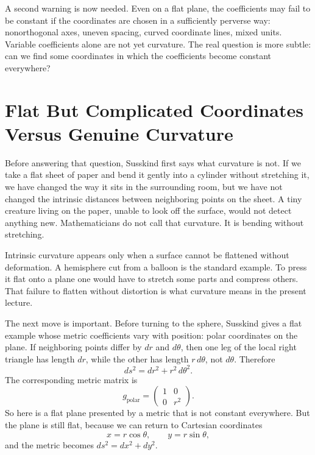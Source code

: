 A second warning is now needed. Even on a flat plane, the coefficients may fail to be constant if the coordinates are chosen in a sufficiently perverse way: nonorthogonal axes, uneven spacing, curved coordinate lines, mixed units. Variable coefficients alone are not yet curvature. The real question is more subtle: can we find some coordinates in which the coefficients become constant everywhere?

\section{Flat But Complicated Coordinates Versus Genuine Curvature}

Before answering that question, Susskind first says what curvature is not. If we take a flat sheet of paper and bend it gently into a cylinder without stretching it, we have changed the way it sits in the surrounding room, but we have not changed the intrinsic distances between neighboring points on the sheet. A tiny creature living on the paper, unable to look off the surface, would not detect anything new. Mathematicians do not call that curvature. It is bending without stretching.

Intrinsic curvature appears only when a surface cannot be flattened without deformation. A hemisphere cut from a balloon is the standard example. To press it flat onto a plane one would have to stretch some parts and compress others. That failure to flatten without distortion is what curvature means in the present lecture.

The next move is important. Before turning to the sphere, Susskind gives a flat example whose metric coefficients vary with position: polar coordinates on the plane. If neighboring points differ by \(dr\) and \(d\theta\), then one leg of the local right triangle has length \(dr\), while the other has length \(r\,d\theta\), not \(d\theta\). Therefore
\begin{equation}
ds^2 = dr^2 + r^2\,d\theta^2.
\end{equation}
The corresponding metric matrix is
\begin{equation}
g_{\text{polar}}=
\begin{pmatrix}
1 & 0 \\
0 & r^2
\end{pmatrix}.
\end{equation}
So here is a flat plane presented by a metric that is not constant everywhere. But the plane is still flat, because we can return to Cartesian coordinates
\begin{equation}
x=r\cos\theta, \qquad y=r\sin\theta,
\end{equation}
and the metric becomes \(ds^2=dx^2+dy^2\).

